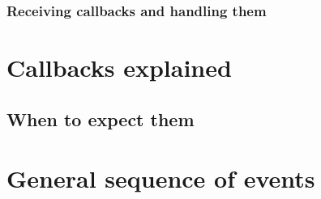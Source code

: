 \subsubsection*{Receiving callbacks and handling them}

\section*{Callbacks explained}

\subsection*{When to expect them}

\section*{General sequence of events}